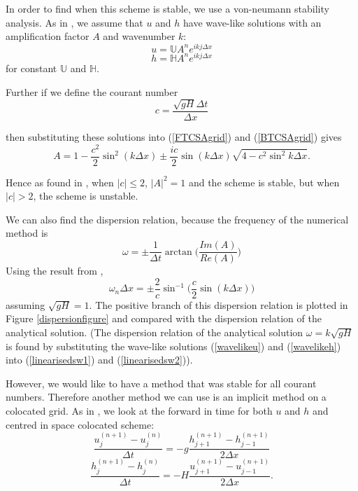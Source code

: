 \documentclass[a4paper,12pt, notitlepage]{report}
\begin{document}
In order to find when this scheme is stable, we use a von-neumann stability analysis. As in \cite{MPE textbook}, we assume that $u$ and $h$ have wave-like solutions with an amplification factor $A$ and wavenumber $k$:
\begin{equation} \label{wavelikeu}
u  =  \mathbb{U}  A^{n} e^{ikj\Delta x}
\end{equation}
\begin{equation} \label{wavelikeh}
h  =  \mathbb{H} A^{n} e^{ikj\Delta x}
\end{equation}
for constant $\mathbb{U}$ and $\mathbb{H}$.

Further if we define the courant number 
\begin{equation}\label{courantnumber}
c = \frac{\sqrt{gH}\Delta t}{\Delta x}
\end{equation}

then substituting these solutions into (\ref{FTCSAgrid}) and (\ref{BTCSAgrid}) gives
\begin{equation}
A = 1 - \frac{c^{2}}{2} \sin^{2}(k\Delta x) \pm \frac{ic}{2}\sin(k\Delta x)\sqrt{4 - c^{2}\sin^{2}k\Delta x}.
\end{equation} 
 
Hence as found in \cite{MPE textbook}, when $\lvert c \rvert \leq 2$, $\lvert A \rvert^{2} = 1$ and the scheme is stable, but when $\lvert c \rvert > 2$, the scheme is unstable.
 
We can also find the dispersion relation, because the frequency of the numerical method is 
\begin{equation} \label{frequency}
\omega = \pm \frac{1}{\Delta t} \arctan\bigg(\frac{Im(A)}{Re(A)}\bigg)
\end{equation}
Using the result from \cite{MPE textbook}, 
\begin{equation}
\omega_{n}\Delta x = \pm \frac{2}{c} \sin^{-1} \bigg(\frac{c}{2}\sin(k\Delta x)\bigg)
\end{equation}
assuming $\sqrt{gH} = 1$. The positive branch of this dispersion relation is plotted in Figure \ref{dispersionfigure} and compared with the dispersion relation of the analytical solution. (The dispersion relation of the analytical solution $\omega = k\sqrt{gH}$ is found by substituting the wave-like solutions (\ref{wavelikeu}) and (\ref{wavelikeh}) into (\ref{linearisedsw1}) and (\ref{linearisedsw2})).


However, we would like to have a method that was stable for all courant numbers. Therefore another method we can use is an implicit method on a colocated grid. As in \cite{MPE textbook}, we look at the forward in time for both $u$ and $h$ and centred in space colocated scheme:
\begin{equation} \label{FTimplicitAgrid1}
\frac{u_{j}^{(n+1)} - u_{j}^{(n)}}{\Delta t} = -g \frac{h_{j+1}^{(n+1)} - h_{j-1}^{(n+1)}}{2\Delta x}
\end{equation}
\begin{equation}\label{FTimplicitAgrid2}
\frac{h_{j}^{(n+1)} - h_{j}^{(n)}}{\Delta t} = -H \frac{u_{j+1}^{(n+1)} - u_{j-1}^{(n+1)}}{2\Delta x}.
\end{equation}
\end{document}
